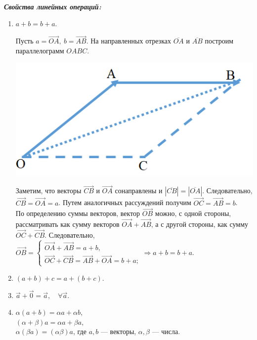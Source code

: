 \textbf{\textit{Свойства линейных операций:}}\begin{enumerate}
	\item $a+b = b+a$.\begin{Proof}
		Пусть $a = \overrightarrow{OA},\ b=\overrightarrow{AB}$. На направленных отрезках $\overline{OA}$ и $\overline{AB}$ построим параллелограмм $OABC$.\begin{center}
			\includegraphics[scale=0.65]{images/vec_sum.png}
		\end{center}
		Заметим, что векторы $\overrightarrow{CB}$ и $\overrightarrow{OA}$ сонаправлены и $|\overline{CB}| = |\overline{OA}|$. Следовательно, $\overrightarrow{CB} = \overrightarrow{OA} = a$. Путем аналогичных рассуждений получим $\overrightarrow{OC} = \overrightarrow{AB} = b$.\\
		По определению суммы векторов, вектор $\overrightarrow{OB}$ можно, с одной стороны, рассматривать как сумму векторов $\overrightarrow{OA} + \overrightarrow{AB}$, а с другой стороны, как сумму $\overrightarrow{OC} + \overrightarrow{CB}$. Следовательно, $\overrightarrow{OB} = \begin{cases}
			\overrightarrow{OA} + \overrightarrow{AB} = a + b,\\
			\overrightarrow{OC} + \overrightarrow{CB} = \overrightarrow{AB} + \overrightarrow{OA} = b + a;
		\end{cases}\Rightarrow a + b = b + a.$			
	\end{Proof}
	\item $(a+b) + c = a + (b+c)$.
	\item $\vec{a} + \vec{0} = \vec{a},\quad \forall \vec{a}$.
	\item $\alpha(a+b) = \alpha a + \alpha b$,\\
	$(\alpha + \beta) a = \alpha a + \beta a$,\\
	$\alpha(\beta a) = (\alpha\beta) a$, где $a,b$ --- векторы, $\alpha, \beta$ --- числа.
\end{enumerate}
